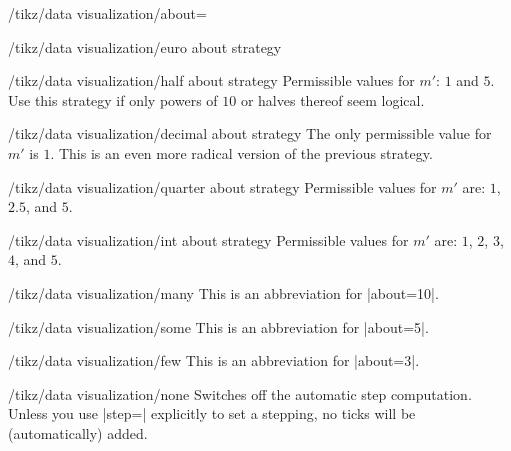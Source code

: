 \begin{key}{/tikz/data visualization/about=}
\begin{key}{/tikz/data visualization/euro about strategy}
  \end{key}

  \begin{key}{/tikz/data visualization/half about strategy}
    Permissible values for $m'$: $1$ and $5$. Use this
    strategy if only powers of $10$ or halves thereof seem logical.

  \end{key}

  \begin{key}{/tikz/data visualization/decimal about strategy}
    The only permissible value for $m'$ is $1$. This is an even more
    radical version of the previous strategy.

  \end{key}

  \begin{key}{/tikz/data visualization/quarter about strategy}
    Permissible values for $m'$ are: $1$, $2.5$, and $5$.

  \end{key}

  \begin{key}{/tikz/data visualization/int about strategy}
    Permissible values for $m'$ are: $1$, $2$, $3$, $4$, and $5$.

  \end{key}
\end{key}

\begin{key}{/tikz/data visualization/many}
  This is an abbreviation for |about=10|.
\end{key}

\begin{key}{/tikz/data visualization/some}
  This is an abbreviation for |about=5|.
\end{key}

\begin{key}{/tikz/data visualization/few}
  This is an abbreviation for |about=3|.
\end{key}

\begin{key}{/tikz/data visualization/none}
  Switches off the automatic step computation. Unless you use |step=|
  explicitly to set a stepping, no ticks will be (automatically)
  added.
\end{key}



